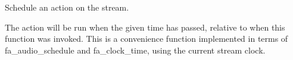 Schedule an action on the stream. 

The action will be run when the given time has passed, relative to when this function was invoked. This is a convenience function implemented in terms of {\ttfamily fa\-\_\-audio\-\_\-schedule} and {\ttfamily fa\-\_\-clock\-\_\-time}, using the current stream clock. 
